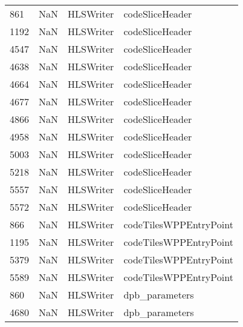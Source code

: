 \begin{tabular}{llll}
861  &                   NaN &                  HLSWriter &                           codeSliceHeader \\
1192 &                   NaN &                  HLSWriter &                           codeSliceHeader \\
4547 &                   NaN &                  HLSWriter &                           codeSliceHeader \\
4638 &                   NaN &                  HLSWriter &                           codeSliceHeader \\
4664 &                   NaN &                  HLSWriter &                           codeSliceHeader \\
4677 &                   NaN &                  HLSWriter &                           codeSliceHeader \\
4866 &                   NaN &                  HLSWriter &                           codeSliceHeader \\
4958 &                   NaN &                  HLSWriter &                           codeSliceHeader \\
5003 &                   NaN &                  HLSWriter &                           codeSliceHeader \\
5218 &                   NaN &                  HLSWriter &                           codeSliceHeader \\
5557 &                   NaN &                  HLSWriter &                           codeSliceHeader \\
5572 &                   NaN &                  HLSWriter &                           codeSliceHeader \\
866  &                   NaN &                  HLSWriter &                    codeTilesWPPEntryPoint \\
1195 &                   NaN &                  HLSWriter &                    codeTilesWPPEntryPoint \\
5379 &                   NaN &                  HLSWriter &                    codeTilesWPPEntryPoint \\
5589 &                   NaN &                  HLSWriter &                    codeTilesWPPEntryPoint \\
860  &                   NaN &                  HLSWriter &                            dpb\_parameters \\
4680 &                   NaN &                  HLSWriter &                            dpb\_parameters \\

\end{tabular}
